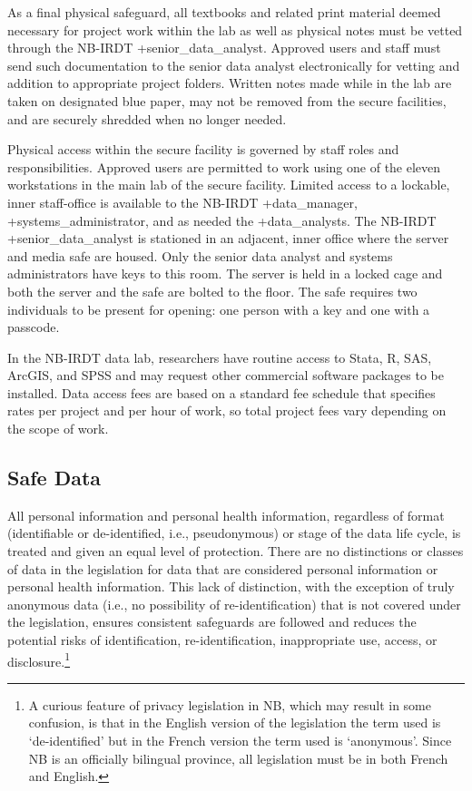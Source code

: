 \documentclass[
]{book}
\begin{document}
As a final physical safeguard, all textbooks and related print material deemed necessary for project work within the lab as well as physical notes must be vetted through the NB-IRDT +senior\_data\_analyst\textbar. Approved users and staff must send such documentation to the senior data analyst electronically for vetting and addition to appropriate project folders. Written notes made while in the lab are taken on designated blue paper, may not be removed from the secure facilities, and are securely shredded when no longer needed.

Physical access within the secure facility is governed by staff roles and responsibilities. Approved users are permitted to work using one of the eleven workstations in the main lab of the secure facility. Limited access to a lockable, inner staff-office is available to the NB-IRDT +data\_manager\textbar, +systems\_administrator\textbar, and as needed the +data\_analysts\textbar. The NB-IRDT +senior\_data\_analyst\textbar{} is stationed in an adjacent, inner office where the server and media safe are housed. Only the senior data analyst and systems administrators have keys to this room. The server is held in a locked cage and both the server and the safe are bolted to the floor. The safe requires two individuals to be present for opening: one person with a key and one with a passcode. ~~

In the NB-IRDT data lab, researchers have routine access to Stata, R, SAS, ArcGIS, and SPSS and may request other commercial software packages to be installed. Data access fees are based on a standard fee schedule that specifies rates per project and per hour of work, so total project fees vary depending on the scope of work.

\hypertarget{safe-data-2}{%
\subsection{Safe Data}\label{safe-data-2}}

All personal information and personal health information, regardless of format (identifiable or de-identified, i.e., pseudonymous) or stage of the data life cycle, is treated and given an equal level of protection. There are no distinctions or classes of data in the legislation for data that are considered personal information or personal health information. This lack of distinction, with the exception of truly anonymous data (i.e., no possibility of re-identification) that is not covered under the legislation, ensures consistent safeguards are followed and reduces the potential risks of identification, re-identification, inappropriate use, access, or disclosure.\footnote{A curious feature of privacy legislation in NB, which may result in some confusion, is that in the English version of the legislation the term used is `de-identified' but in the French version the term used is `anonymous'. Since NB is an officially bilingual province, all legislation must be in both French and English.}
\end{document}
